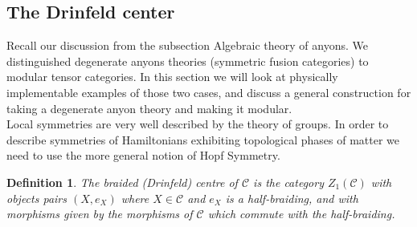 \documentclass{article}
\newtheorem{definition}{Definition}
\begin{document}
\subsection{The Drinfeld center}
Recall our discussion from the subsection Algebraic theory of anyons. We distinguished degenerate anyons theories (symmetric fusion categories) to modular tensor categories. In this section we will look at physically implementable examples of those two cases, and discuss a general construction for taking a degenerate anyon theory and making it modular.\\
Local symmetries are very well described by the theory of groups. In order to describe symmetries of Hamiltonians exhibiting topological phases of matter we need to use the more general notion of Hopf Symmetry.

\begin{definition}
	The braided (Drinfeld) centre of $\mathcal{C}$ is the category $Z_1(\mathcal{C})$ with objects pairs $(X,e_X)$ where $X \in \mathcal{C}$ and $e_X$ is a half-braiding, and with morphisms given by the morphisms of $\mathcal{C}$ which commute with the half-braiding.
\end{definition}
\end{document}
